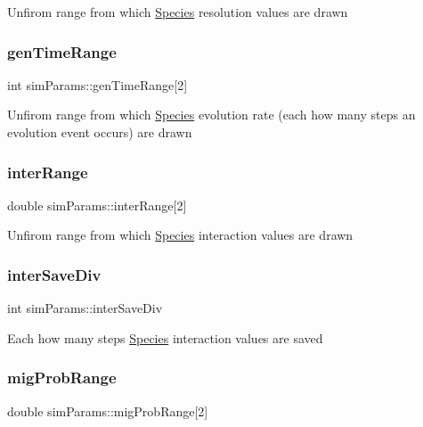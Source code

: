 Unfirom range from which \hyperlink{classSpecies}{Species} resolution values are drawn \mbox{\label{structsimParams_ace2069f1d65920fe32e4236c12e91ea9}} 
\subsubsection{\texorpdfstring{gen\+Time\+Range}{genTimeRange}}
{\footnotesize\ttfamily int sim\+Params\+::gen\+Time\+Range\mbox{[}2\mbox{]}}

Unfirom range from which \hyperlink{classSpecies}{Species} evolution rate (each how many steps an evolution event occurs) are drawn \mbox{\label{structsimParams_a459d8e2a902ef06f2e6ccce91a5f40bc}} 
\subsubsection{\texorpdfstring{inter\+Range}{interRange}}
{\footnotesize\ttfamily double sim\+Params\+::inter\+Range\mbox{[}2\mbox{]}}

Unfirom range from which \hyperlink{classSpecies}{Species} interaction values are drawn \mbox{\label{structsimParams_a2114f7c6664772255e0e8afcf9334ebf}} 
\subsubsection{\texorpdfstring{inter\+Save\+Div}{interSaveDiv}}
{\footnotesize\ttfamily int sim\+Params\+::inter\+Save\+Div}

Each how many steps \hyperlink{classSpecies}{Species} interaction values are saved \mbox{\label{structsimParams_a4a67c773b31598604c56efc130a69945}} 
\subsubsection{\texorpdfstring{mig\+Prob\+Range}{migProbRange}}
{\footnotesize\ttfamily double sim\+Params\+::mig\+Prob\+Range\mbox{[}2\mbox{]}}

